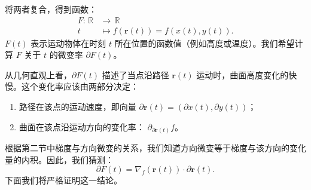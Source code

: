 \documentclass[12pt,UTF8]{ctexbook}
\begin{document}
将两者复合，得到函数：
\begin{align*}
    F: \,\mathbb{R} &\to\, \mathbb{R}\\
    t\, &\mapsto f(\mathbf{r}(t)) = f(x(t), y(t)).
\end{align*}
$F(t)$ 表示运动物体在时刻 $t$ 所在位置的函数值（例如高度或温度）。我们希望计算 $F$ 关于 $t$ 的微变率 $\partial F(t)$。


从几何直观上看，$\partial F(t)$ 描述了当点沿路径 $\mathbf{r}(t)$ 运动时，曲面高度变化的快慢。这个变化率应该由两部分决定：
\begin{enumerate}[label=\arabic*.]
\item 路径在该点的运动速度，即向量 $\partial\mathbf{r}(t) = \left(\partial x(t), \partial y(t)\right)$；
\item 曲面在该点沿运动方向的变化率： $\partial_{\partial\mathbf{r}(t)} f$。
\end{enumerate}
根据第二节中梯度与方向微变的关系，我们知道方向微变等于梯度与该方向的变化量的内积。因此，我们猜测：
$$ \partial F(t) = \nabla_f(\mathbf{r}(t)) \cdot \partial\mathbf{r}(t). $$
下面我们将严格证明这一结论。
\end{document}
